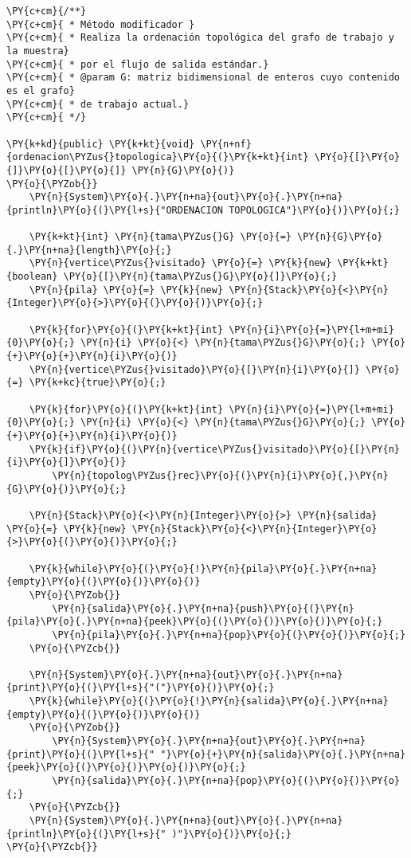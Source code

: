 \begin{Verbatim}[commandchars=\\\{\}]
\PY{c+cm}{/**}
\PY{c+cm}{ * Método modificador }
\PY{c+cm}{ * Realiza la ordenación topológica del grafo de trabajo y la muestra}
\PY{c+cm}{ * por el flujo de salida estándar.}
\PY{c+cm}{ * @param G: matriz bidimensional de enteros cuyo contenido es el grafo}
\PY{c+cm}{ * de trabajo actual.}
\PY{c+cm}{ */}

\PY{k+kd}{public} \PY{k+kt}{void} \PY{n+nf}{ordenacion\PYZus{}topologica}\PY{o}{(}\PY{k+kt}{int} \PY{o}{[}\PY{o}{]}\PY{o}{[}\PY{o}{]} \PY{n}{G}\PY{o}{)}
\PY{o}{\PYZob{}}
    \PY{n}{System}\PY{o}{.}\PY{n+na}{out}\PY{o}{.}\PY{n+na}{println}\PY{o}{(}\PY{l+s}{"ORDENACION TOPOLOGICA"}\PY{o}{)}\PY{o}{;}
	
    \PY{k+kt}{int} \PY{n}{tama\PYZus{}G} \PY{o}{=} \PY{n}{G}\PY{o}{.}\PY{n+na}{length}\PY{o}{;}
    \PY{n}{vertice\PYZus{}visitado} \PY{o}{=} \PY{k}{new} \PY{k+kt}{boolean} \PY{o}{[}\PY{n}{tama\PYZus{}G}\PY{o}{]}\PY{o}{;}
    \PY{n}{pila} \PY{o}{=} \PY{k}{new} \PY{n}{Stack}\PY{o}{<}\PY{n}{Integer}\PY{o}{>}\PY{o}{(}\PY{o}{)}\PY{o}{;}

    \PY{k}{for}\PY{o}{(}\PY{k+kt}{int} \PY{n}{i}\PY{o}{=}\PY{l+m+mi}{0}\PY{o}{;} \PY{n}{i} \PY{o}{<} \PY{n}{tama\PYZus{}G}\PY{o}{;} \PY{o}{+}\PY{o}{+}\PY{n}{i}\PY{o}{)}
	\PY{n}{vertice\PYZus{}visitado}\PY{o}{[}\PY{n}{i}\PY{o}{]} \PY{o}{=} \PY{k+kc}{true}\PY{o}{;}

    \PY{k}{for}\PY{o}{(}\PY{k+kt}{int} \PY{n}{i}\PY{o}{=}\PY{l+m+mi}{0}\PY{o}{;} \PY{n}{i} \PY{o}{<} \PY{n}{tama\PYZus{}G}\PY{o}{;} \PY{o}{+}\PY{o}{+}\PY{n}{i}\PY{o}{)}
	\PY{k}{if}\PY{o}{(}\PY{n}{vertice\PYZus{}visitado}\PY{o}{[}\PY{n}{i}\PY{o}{]}\PY{o}{)}
	    \PY{n}{topolog\PYZus{}rec}\PY{o}{(}\PY{n}{i}\PY{o}{,}\PY{n}{G}\PY{o}{)}\PY{o}{;}

    \PY{n}{Stack}\PY{o}{<}\PY{n}{Integer}\PY{o}{>} \PY{n}{salida} \PY{o}{=} \PY{k}{new} \PY{n}{Stack}\PY{o}{<}\PY{n}{Integer}\PY{o}{>}\PY{o}{(}\PY{o}{)}\PY{o}{;}

    \PY{k}{while}\PY{o}{(}\PY{o}{!}\PY{n}{pila}\PY{o}{.}\PY{n+na}{empty}\PY{o}{(}\PY{o}{)}\PY{o}{)}
	\PY{o}{\PYZob{}}
	    \PY{n}{salida}\PY{o}{.}\PY{n+na}{push}\PY{o}{(}\PY{n}{pila}\PY{o}{.}\PY{n+na}{peek}\PY{o}{(}\PY{o}{)}\PY{o}{)}\PY{o}{;}
	    \PY{n}{pila}\PY{o}{.}\PY{n+na}{pop}\PY{o}{(}\PY{o}{)}\PY{o}{;}
	\PY{o}{\PYZcb{}}

    \PY{n}{System}\PY{o}{.}\PY{n+na}{out}\PY{o}{.}\PY{n+na}{print}\PY{o}{(}\PY{l+s}{"("}\PY{o}{)}\PY{o}{;}
    \PY{k}{while}\PY{o}{(}\PY{o}{!}\PY{n}{salida}\PY{o}{.}\PY{n+na}{empty}\PY{o}{(}\PY{o}{)}\PY{o}{)}
	\PY{o}{\PYZob{}}
	    \PY{n}{System}\PY{o}{.}\PY{n+na}{out}\PY{o}{.}\PY{n+na}{print}\PY{o}{(}\PY{l+s}{" "}\PY{o}{+}\PY{n}{salida}\PY{o}{.}\PY{n+na}{peek}\PY{o}{(}\PY{o}{)}\PY{o}{)}\PY{o}{;}
	    \PY{n}{salida}\PY{o}{.}\PY{n+na}{pop}\PY{o}{(}\PY{o}{)}\PY{o}{;}
	\PY{o}{\PYZcb{}}
    \PY{n}{System}\PY{o}{.}\PY{n+na}{out}\PY{o}{.}\PY{n+na}{println}\PY{o}{(}\PY{l+s}{" )"}\PY{o}{)}\PY{o}{;}
\PY{o}{\PYZcb{}}


\end{Verbatim}
